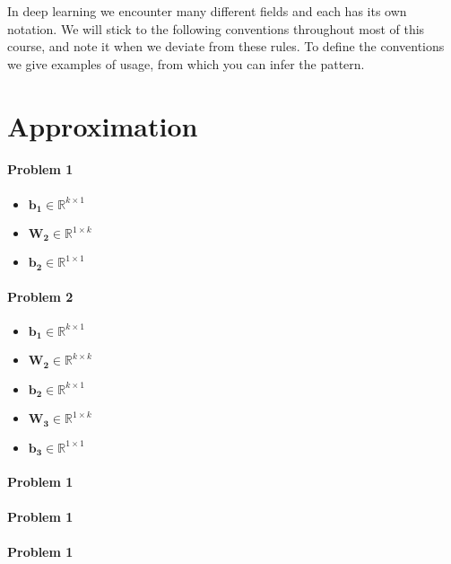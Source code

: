 \documentclass[12pt,letterpaper]{article}
\begin{document}
\newcommand{\xin}{\mathbf{x}_{\texttt{in}}}
\newcommand{\xout}{\mathbf{x}_{\texttt{out}}}
\newcommand{\xini}{x_{\texttt{in}_i}}
\newcommand{\xouti}{x_{\texttt{out}_i}}
\newcommand{\xink}{x_{\texttt{in}_k}}

In deep learning we encounter many different fields and each has its own notation. We will stick to the following conventions throughout most of this course, and note it when we deviate from these rules. To define the conventions we give examples of usage, from which you can infer the pattern.

\section{Approximation}

\paragraph{Problem 1}

\begin{itemize}
\item $\mathbf{b_1} \in \mathbb{R}^{k \times 1}$
\item $\mathbf{W_2} \in \mathbb{R}^{1 \times k}$
\item $\mathbf{b_2} \in \mathbb{R}^{1 \times 1}$
\end{itemize}

\paragraph{Problem 2}

\begin{itemize}
\item $\mathbf{b_1} \in \mathbb{R}^{k \times 1}$
\item $\mathbf{W_2} \in \mathbb{R}^{k \times k}$
\item $\mathbf{b_2} \in \mathbb{R}^{k \times 1}$
\item $\mathbf{W_3} \in \mathbb{R}^{1 \times k}$
\item $\mathbf{b_3} \in \mathbb{R}^{1 \times 1}$

\end{itemize}

\paragraph{Problem 1}

\paragraph{Problem 1}

\paragraph{Problem 1}
\end{document}
